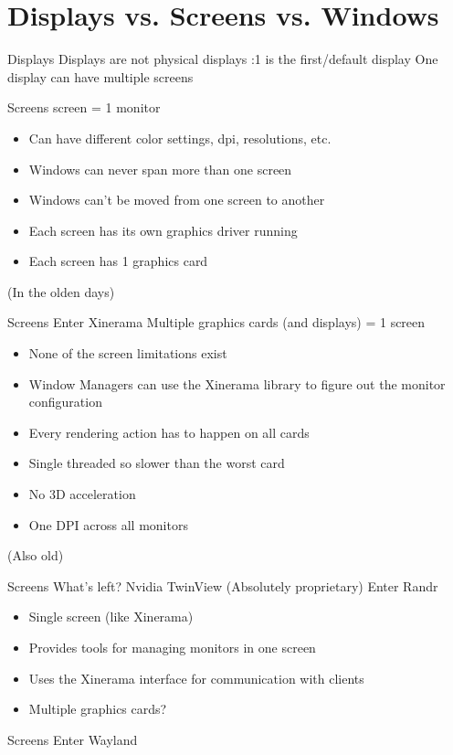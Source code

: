 \documentclass[10pt]{beamer}
\begin{document}
\section{Displays vs. Screens vs. Windows}

\begin{frame}[fragile]{Displays}
  \pause
  Displays are not physical displays
  \pause
  :1 is the first/default display
  \pause
  One display can have multiple screens

\end{frame}

\begin{frame}[fragile]{Screens}
   screen = 1 monitor
  \begin{itemize}[<+->]
    \item Can have different color settings, dpi, resolutions, etc.
    \item Windows can never span more than one screen
    \item Windows can't be moved from one screen to another
    \item Each screen has its own graphics driver running
    \item Each screen has 1 graphics card
  \end{itemize}
  \pause
  (In the olden days)
\end{frame}
\begin{frame}[fragile]{Screens}
  Enter Xinerama
  \pause
  Multiple graphics cards (and displays) = 1 screen
  \begin{itemize}[<+->]
    \item None of the screen limitations exist
    \item Window Managers can use the Xinerama library to figure out the monitor
      configuration
    \item Every rendering action has to happen on all cards
    \item Single threaded so slower than the worst card
    \item No 3D acceleration
    \item One DPI across all monitors
  \end{itemize}
  \pause
  (Also old)
\end{frame}
\begin{frame}[fragile]{Screens}
  What's left?
  \pause
  Nvidia TwinView
  \pause
  (Absolutely proprietary)
  \pause
  Enter Randr
  \begin{itemize}[<+->]
    \item Single screen (like Xinerama)
    \item Provides tools for managing monitors in one screen
    \item Uses the Xinerama interface for communication with clients
    \item Multiple graphics cards?
  \end{itemize}
\end{frame}
\pause
\begin{frame}[fragile]{Screens}
Enter Wayland
\end{frame}
\end{document}
